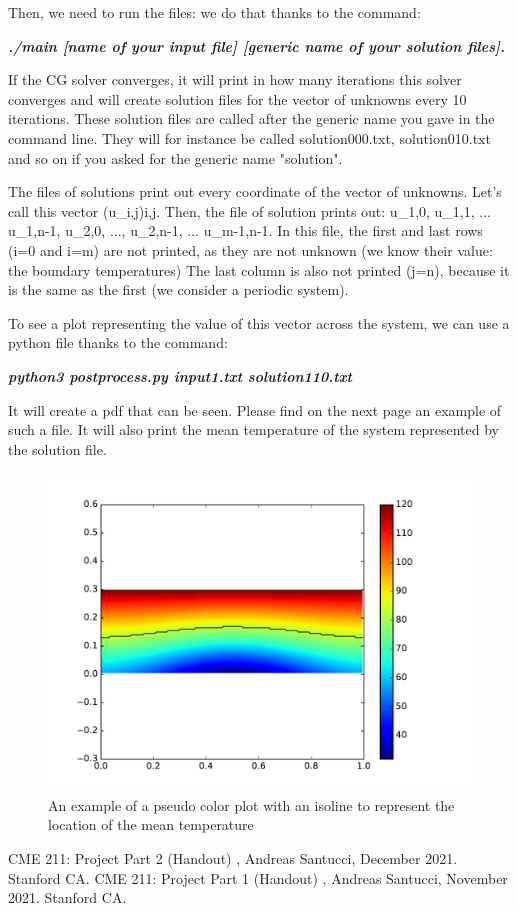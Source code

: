 \documentclass{article}
\begin{document}
Then, we need to run the files: we do that thanks to the command: 

\textbf{\textit{./main [name of your input file] 
[generic name of your solution files].}}

If the CG solver converges, it will print in how many 
iterations this solver converges and will create 
solution files for the vector of unknowns every 10 iterations. 
These solution files are called after the generic name you gave 
in the command line. They will for instance be called 
solution000.txt, solution010.txt and so on if you asked for the 
generic name "solution".

The files of solutions print out every coordinate of the vector 
of unknowns. Let's call this vector (u\_i,j)i,j. Then, the 
file of solution prints out: u\_1,0, u\_1,1, ... u\_1,n-1, 
u\_2,0, ..., u\_2,n-1, ... u\_m-1,n-1.
In this file, the first and last rows (i=0 and i=m) are not printed, 
as they are not unknown (we know their value: the boundary temperatures) 
The last column is also not printed (j=n), because it is the 
same as the first (we consider a periodic system).

To see a plot representing the value of this vector across the 
system, we can use a python file thanks to the command: 

\textbf{\textit{python3 postprocess.py input1.txt solution110.txt}}

It will create a pdf that can be seen. Please find on the next page
an example of such a file. It will also print the mean temperature 
of the system represented by the solution file.

\begin{figure}
    \centering
    \includegraphics[scale=0.8]{Pseudocolor plot.pdf}
    \caption{An example of a pseudo color plot with an isoline
    to represent the location of the mean temperature}
    \label{fig:my_label}
\end{figure}

\begin{thebibliography}{2}
CME 211: Project Part 2 (Handout)
, Andreas Santucci, December 2021. Stanford
 CA.
CME 211: Project Part 1 (Handout)
, Andreas Santucci, November 2021. Stanford
 CA.

\end{thebibliography}
\end{document}

